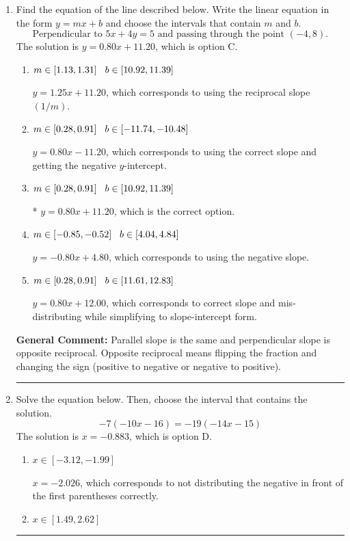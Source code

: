 \documentclass{extbook}[14pt]
\newcommand{\litem}[1]{\item #1

\rule{\textwidth}{0.4pt}}
\begin{document}
\begin{enumerate}\litem{
Find the equation of the line described below. Write the linear equation in the form $ y=mx+b $ and choose the intervals that contain $m$ and $b$.
\[ \text{Perpendicular to } 5 x + 4 y = 5 \text{ and passing through the point } (-4, 8). \]The solution is \( y = 0.80x + 11.20 \), which is option C.\begin{enumerate}[label=\Alph*.]
\item \( m \in [1.13, 1.31] \hspace*{3mm} b \in [10.92, 11.39] \)

 $y = 1.25x + 11.20$, which corresponds to using the reciprocal slope $(1/m)$.
\item \( m \in [0.28, 0.91] \hspace*{3mm} b \in [-11.74, -10.48] \)

 $y = 0.80x - 11.20$, which corresponds to using the correct slope and getting the negative $y$-intercept.
\item \( m \in [0.28, 0.91] \hspace*{3mm} b \in [10.92, 11.39] \)

* $y = 0.80x + 11.20$, which is the correct option.
\item \( m \in [-0.85, -0.52] \hspace*{3mm} b \in [4.04, 4.84] \)

 $y = -0.80x + 4.80$, which corresponds to using the negative slope.
\item \( m \in [0.28, 0.91] \hspace*{3mm} b \in [11.61, 12.83] \)

 $y = 0.80x + 12.00$, which corresponds to correct slope and mis-distributing while simplifying to slope-intercept form.
\end{enumerate}

\textbf{General Comment:} Parallel slope is the same and perpendicular slope is opposite reciprocal. Opposite reciprocal means flipping the fraction and changing the sign (positive to negative or negative to positive).
}
\litem{
Solve the equation below. Then, choose the interval that contains the solution.
\[ -7(-10x -16) = -19(-14x -15) \]The solution is \( x = -0.883 \), which is option D.\begin{enumerate}[label=\Alph*.]
\item \( x \in [-3.12, -1.99] \)

$x = -2.026$, which corresponds to not distributing the negative in front of the first parentheses correctly.
\item \( x \in [1.49, 2.62] \)


\end{enumerate}}
\end{enumerate}
\end{document}
